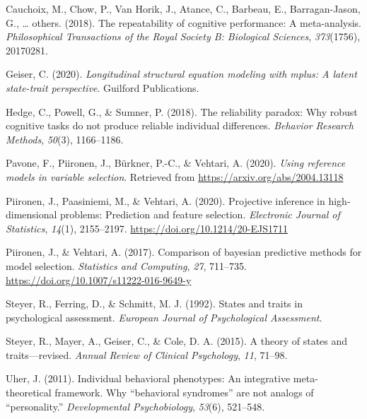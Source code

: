 \documentclass[
  man,floatsintext]{apa6}
\newlength{\cslhangindent}
\newlength{\cslentryspacingunit} %
\newenvironment{CSLReferences}[2] %
 {%
  \setlength{\parindent}{0pt}
  \ifodd #1
  \let\oldpar\par
  \def\par{\hangindent=\cslhangindent\oldpar}
  \fi
  \setlength{\parskip}{#2\cslentryspacingunit}
 }%
 {}
\begin{document}
\hypertarget{refs}{}
\begin{CSLReferences}{1}{0}
\leavevmode{}%
Cauchoix, M., Chow, P., Van Horik, J., Atance, C., Barbeau, E., Barragan-Jason, G., \ldots{} others. (2018). The repeatability of cognitive performance: A meta-analysis. \emph{Philosophical Transactions of the Royal Society B: Biological Sciences}, \emph{373}(1756), 20170281.

\leavevmode{}%
Geiser, C. (2020). \emph{Longitudinal structural equation modeling with mplus: A latent state-trait perspective}. Guilford Publications.

\leavevmode{}%
Hedge, C., Powell, G., \& Sumner, P. (2018). The reliability paradox: Why robust cognitive tasks do not produce reliable individual differences. \emph{Behavior Research Methods}, \emph{50}(3), 1166--1186.

\leavevmode{}%
Pavone, F., Piironen, J., Bürkner, P.-C., \& Vehtari, A. (2020). \emph{Using reference models in variable selection}. Retrieved from \url{https://arxiv.org/abs/2004.13118}

\leavevmode{}%
Piironen, J., Paasiniemi, M., \& Vehtari, A. (2020). {Projective inference in high-dimensional problems: Prediction and feature selection}. \emph{Electronic Journal of Statistics}, \emph{14}(1), 2155--2197. \url{https://doi.org/10.1214/20-EJS1711}

\leavevmode{}%
Piironen, J., \& Vehtari, A. (2017). Comparison of bayesian predictive methods for model selection. \emph{Statistics and Computing}, \emph{27}, 711--735. \url{https://doi.org/10.1007/s11222-016-9649-y}

\leavevmode{}%
Steyer, R., Ferring, D., \& Schmitt, M. J. (1992). States and traits in psychological assessment. \emph{European Journal of Psychological Assessment}.

\leavevmode{}%
Steyer, R., Mayer, A., Geiser, C., \& Cole, D. A. (2015). A theory of states and traits---revised. \emph{Annual Review of Clinical Psychology}, \emph{11}, 71--98.

\leavevmode{}%
Uher, J. (2011). Individual behavioral phenotypes: An integrative meta-theoretical framework. Why {``behavioral syndromes''} are not analogs of {``personality.''} \emph{Developmental Psychobiology}, \emph{53}(6), 521--548.

\end{CSLReferences}

\endgroup
\end{document}
